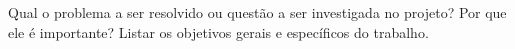 Qual o problema a ser resolvido ou questão a ser investigada no
projeto? Por que ele é importante? Listar os objetivos gerais e específicos do
trabalho.